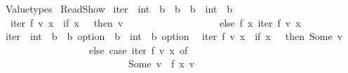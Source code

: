 %
\begin{isabellebody}%
%
%
\isadelimdocument
%
\endisadelimdocument
%
\isatagdocument
%
\isamarkuptrue%
%
\endisatagdocument
{\isafolddocument}%
%
\isadelimdocument
%
\endisadelimdocument
%
\isadelimtheory
%
\endisadelimtheory
%
\isatagtheory
{}\isamarkupfalse%
\ Valuetypes\isanewline
{}\ ReadShow\isanewline
{}%
\endisatagtheory
{\isafoldtheory}%
%
\isadelimtheory
\isanewline
%
\endisadelimtheory
\isanewline
{}\isamarkupfalse%
\ iter\ {\isacharcolon}{\kern0pt}{\isacharcolon}{\kern0pt}\ {\isachardoublequoteopen}{\isacharparenleft}{\kern0pt}int\ {\isasymRightarrow}\ {\isacharprime}{\kern0pt}b\ {\isasymRightarrow}\ {\isacharprime}{\kern0pt}b{\isacharparenright}{\kern0pt}\ {\isasymRightarrow}\ {\isacharprime}{\kern0pt}b\ {\isasymRightarrow}\ int\ {\isasymRightarrow}\ {\isacharprime}{\kern0pt}b{\isachardoublequoteclose}\isanewline
{}\isanewline
\ \ {\isachardoublequoteopen}iter\ f\ v\ x\ {\isacharequal}{\kern0pt}\ {\isacharparenleft}{\kern0pt}if\ x\ {\isasymle}\ {}\ then\ v\ \ \isanewline
\ \ \ \ \ \ \ \ \ \ \ \ \ \ \ \ \ else\ f\ {\isacharparenleft}{\kern0pt}x{\isacharminus}{\kern0pt}{}{\isacharparenright}{\kern0pt}\ {\isacharparenleft}{\kern0pt}iter\ f\ v\ {\isacharparenleft}{\kern0pt}x{\isacharminus}{\kern0pt}{}{\isacharparenright}{\kern0pt}{\isacharparenright}{\kern0pt}{\isacharparenright}{\kern0pt}{\isachardoublequoteclose}\isanewline
\isanewline
{}\isamarkupfalse%
\ iter{\isacharprime}{\kern0pt}\ {\isacharcolon}{\kern0pt}{\isacharcolon}{\kern0pt}\ {\isachardoublequoteopen}{\isacharparenleft}{\kern0pt}int\ {\isasymRightarrow}\ {\isacharprime}{\kern0pt}b\ {\isasymRightarrow}\ {\isacharprime}{\kern0pt}b\ option{\isacharparenright}{\kern0pt}\ {\isasymRightarrow}\ {\isacharprime}{\kern0pt}b\ {\isasymRightarrow}\ int\ {\isasymRightarrow}\ {\isacharprime}{\kern0pt}b\ option{\isachardoublequoteclose}\isanewline
{}\isanewline
\ \ {\isachardoublequoteopen}iter{\isacharprime}{\kern0pt}\ f\ v\ x\ {\isacharequal}{\kern0pt}\ {\isacharparenleft}{\kern0pt}if\ x\ {\isasymle}\ {}\ then\ Some\ v\isanewline
\ \ \ \ \ \ \ \ \ \ \ \ \ \ \ \ \ \ else\ case\ iter{\isacharprime}{\kern0pt}\ f\ v\ {\isacharparenleft}{\kern0pt}x{\isacharminus}{\kern0pt}{}{\isacharparenright}{\kern0pt}\ of\isanewline
\ \ \ \ \ \ \ \ \ \ \ \ \ \ \ \ \ \ \ \ \ \ \ \ \ \ Some\ v{\isacharprime}{\kern0pt}\ {\isasymRightarrow}\ f\ {\isacharparenleft}{\kern0pt}x{\isacharminus}{\kern0pt}{}{\isacharparenright}{\kern0pt}\ v{\isacharprime}{\kern0pt}\isanewline

\end{isabellebody}
